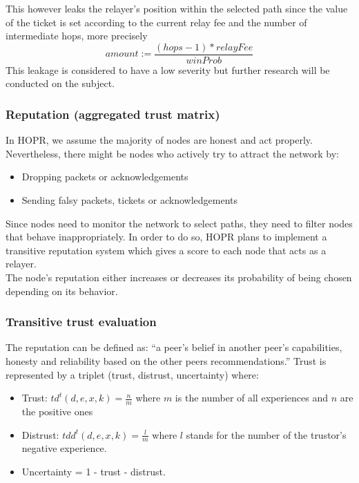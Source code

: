 \hspace{-5mm}This however leaks the relayer’s position within the selected path since the value of the ticket is set according to the current relay fee and the number of intermediate hops,
more precisely $$amount:=\frac{(hops -1)* relayFee}{winProb}$$
This leakage is considered to have a low severity but further research will be conducted on the subject.
\subsubsection{Reputation (aggregated trust matrix)}

In HOPR, we assume the majority of nodes are honest and act properly. Nevertheless, there might be nodes who actively try to attract the network by:
\begin{itemize}
    \item Dropping packets or acknowledgements
    \item Sending falsy packets, tickets or acknowledgements
\end{itemize}
Since nodes need to monitor the network to select paths, they need to filter nodes that behave inappropriately.
In order to do so, HOPR plans to implement a transitive reputation system which gives a score to each node that acts as a relayer.
\\The node’s reputation either increases or decreases its probability of being chosen depending on its behavior.

\subsubsection*{Transitive trust evaluation }
The reputation can be defined as: “a peer’s belief in another peer’s capabilities, honesty and reliability based on the other peers recommendations.”
Trust is represented by a triplet (trust, distrust, uncertainty) where:
\begin{itemize}
    \item Trust: $td^t(d,e,x,k)=\frac{n}{m}$ where $m$ is the number of all experiences and $n$ are the positive ones
    \item Distrust: $tdd^t(d,e,x,k)=\frac{l}{m}$ where $l$ stands for the number of the trustor’s negative experience.
    \item Uncertainty = 1 - trust - distrust.
\end{itemize}

